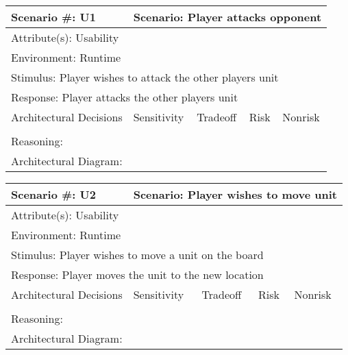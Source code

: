 \begin{tabular}{|m{}|m{}|m{}|m{}|m{}|m{}|}
  \hline
  Scenario \#: U1 & \multicolumn{5}{m{0.75 \textwidth}|}{Scenario: Player attacks opponent} \\ \hline
  \multicolumn{6}{|m{0.9 \textwidth}|}{Attribute(s): Usability} \\ \hline
  \multicolumn{6}{|m{0.9 \textwidth}|}{Environment: Runtime} \\ \hline
  \multicolumn{6}{|m{0.9 \textwidth}|}{Stimulus: Player wishes to attack the other players unit} \\ \hline
  \multicolumn{6}{|m{0.9 \textwidth}|}{Response: Player attacks the other players unit} \\ \hline
  \multicolumn{2}{|m{0.3 \textwidth}|}{Architectural Decisions} & Sensitivity & Tradeoff & Risk & Nonrisk \\ \hline
  \multicolumn{2}{|m{0.3 \textwidth}|}{} &  &  &  &  \\ \hline
  \multicolumn{6}{|m{0.9 \textwidth}|}{Reasoning:} \\ \hline
  \multicolumn{6}{|m{0.9 \textwidth}|}{Architectural Diagram: } \\ \hline
\end{tabular}

\begin{tabular}{|m{}|m{}|m{}|m{}|m{}|m{}|}
  \hline
  Scenario \#: U2 & \multicolumn{5}{m{0.75 \textwidth}|}{Scenario: Player wishes to move unit} \\ \hline
  \multicolumn{6}{|m{0.9 \textwidth}|}{Attribute(s): Usability} \\ \hline
  \multicolumn{6}{|m{0.9 \textwidth}|}{Environment: Runtime} \\ \hline
  \multicolumn{6}{|m{0.9 \textwidth}|}{Stimulus: Player wishes to move a unit on the board} \\ \hline
  \multicolumn{6}{|m{0.9 \textwidth}|}{Response: Player moves the unit to the new location} \\ \hline
  \multicolumn{2}{|m{0.3 \textwidth}|}{Architectural Decisions} & Sensitivity & Tradeoff & Risk & Nonrisk \\ \hline
  \multicolumn{2}{|m{0.3 \textwidth}|}{} &  &  &  &  \\ \hline
  \multicolumn{6}{|m{0.9 \textwidth}|}{Reasoning:} \\ \hline
  \multicolumn{6}{|m{0.9 \textwidth}|}{Architectural Diagram: } \\ \hline
\end{tabular}
